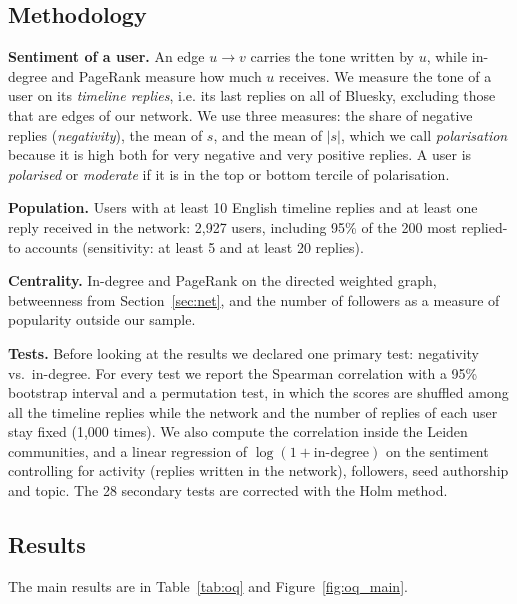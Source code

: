 \documentclass[sigchi]{acmart}
\begin{document}
\subsection{Methodology}
\textbf{Sentiment of a user.} An edge $u \to v$ carries the tone written by $u$, while in-degree and PageRank measure how much $u$ receives. We measure the tone of a user on its \emph{timeline replies}, i.e. its last replies on all of Bluesky, excluding those that are edges of our network. We use three measures: the share of negative replies (\emph{negativity}), the mean of $s$, and the mean of $|s|$, which we call \emph{polarisation} because it is high both for very negative and very positive replies. A user is \emph{polarised} or \emph{moderate} if it is in the top or bottom tercile of polarisation.

\textbf{Population.} Users with at least 10 English timeline replies and at least one reply received in the network: 2,927 users, including 95\% of the 200 most replied-to accounts (sensitivity: at least 5 and at least 20 replies).

\textbf{Centrality.} In-degree and PageRank on the directed weighted graph, betweenness from Section~\ref{sec:net}, and the number of followers as a measure of popularity outside our sample.

\textbf{Tests.} Before looking at the results we declared one primary test: negativity vs.\ in-degree. For every test we report the Spearman correlation with a 95\% bootstrap interval and a permutation test, in which the scores are shuffled among all the timeline replies while the network and the number of replies of each user stay fixed (1,000 times). We also compute the correlation inside the Leiden communities, and a linear regression of $\log(1+\text{in-degree})$ on the sentiment controlling for activity (replies written in the network), followers, seed authorship and topic. The 28 secondary tests are corrected with the Holm method.

\subsection{Results}
The main results are in Table~\ref{tab:oq} and Figure~\ref{fig:oq_main}.
\end{document}
